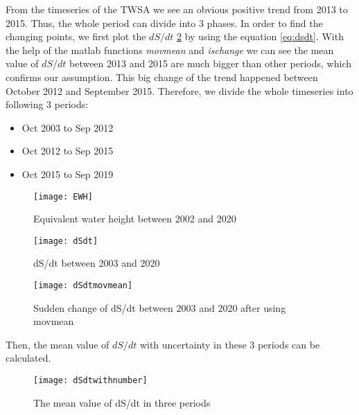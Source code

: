 From the timeseries of the TWSA we see an obvious positive trend from 2013 to 2015. Thus, the whole period can divide into 3 phases. In order to find the changing points, we first plot the $dS/dt$ \ref{fig:dsdtall} by using the equation \ref{eq:dsdt}. With the help of the matlab functions \textit{movmean} and \textit{ischange} we can see the mean value of $dS/dt$ between 2013 and 2015 are much bigger than other periods, which confirms our assumption. This big change of the trend happened between October 2012 and September 2015. Therefore, we divide the whole timeseries into following 3 periods:
\begin{itemize}
	\item Oct 2003 to Sep 2012
	\item Oct 2012 to Sep 2015
	\item Oct 2015 to Sep 2019
\end{itemize}
\begin{figure}[htbp]
	\centering
	\texttt{[image: EWH]} %
	\caption{Equivalent water height between 2002 and 2020} 
	\label{fig:EWHs}
\end{figure}
\begin{figure}[htbp]
	\centering
	\texttt{[image: dSdt]} %
	\caption{dS/dt between 2003 and 2020} 
	\label{fig:dsdtall}
\end{figure}
\begin{figure}[htbp]
	\centering
	\texttt{[image: dSdtmovmean]} %
	\caption{Sudden change of dS/dt between 2003 and 2020 after using movmean} 
	\label{fig:dsdtmovmean}
\end{figure}
Then, the mean value of $dS/dt$ with uncertainty in these 3 periods can be calculated. 
\begin{figure}[htbp]
	\centering
	\texttt{[image: dSdtwithnumber]} %
	\caption{The mean value of dS/dt in three periods} 
	\label{fig:dsdtwithnum}
\end{figure}
\clearpage
